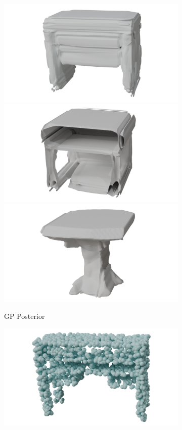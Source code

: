 \begin{figure}[htb]
\begin{subfigure}[t]{0.315\textwidth}
    \includegraphics[width=\textwidth]{figures/gp/t1gp.png}
    \includegraphics[width=\textwidth]{figures/gp/t2gp.png}
    \includegraphics[width=\textwidth]{figures/gp/t3gp.png}
    \caption{GP Posterior}\label{fig:gptable2}
  \end{subfigure}\hfill
  \begin{subfigure}[t]{0.315\textwidth}
    \includegraphics[width=\textwidth]{figures/gp/t1cgp.png}

\end{subfigure}
\end{figure}
